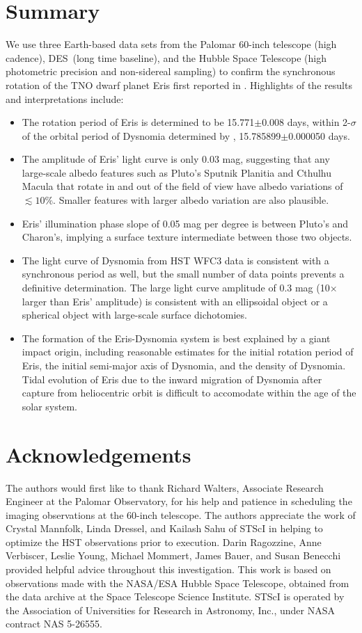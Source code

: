 \documentclass[onecolumn]{aastex631}
\newcommand{\des}{DES}
\begin{document}
\section{Summary}
We use three Earth-based data sets from the Palomar 60-inch telescope (high cadence), \des\ (long time baseline), and the Hubble Space Telescope (high photometric precision and non-sidereal sampling) to confirm the synchronous rotation of the TNO dwarf planet Eris first reported in \citet{szakats}. Highlights of the results and interpretations include:
\begin{itemize}
\item The rotation period of Eris is determined to be 15.771$\pm$0.008 days, within 2-$\sigma$ of the orbital period of Dysnomia determined by \citep{H21}, 15.785899$\pm$0.000050 days.
\item The amplitude of Eris' light curve is only 0.03 mag, suggesting that any large-scale albedo features such as Pluto's Sputnik Planitia and Cthulhu Macula that rotate in and out of the field of view have albedo variations of $\lesssim10\%.$  Smaller features with larger albedo variation are also plausible.
\item Eris' illumination phase slope of 0.05 mag per degree is between Pluto's and Charon's, implying a surface texture intermediate between those two objects.
\item The light curve of Dysnomia from HST WFC3 data is consistent with a synchronous period as well, but the small number of data points prevents a definitive determination. The large light curve amplitude of 0.3 mag (10$\times$ larger than Eris' amplitude) is consistent with an ellipsoidal object or a spherical object with large-scale surface dichotomies.
\item The formation of the Eris-Dysnomia system is best explained by a giant impact origin, including reasonable estimates for the initial rotation period of Eris, the initial semi-major axis of Dysnomia, and the density of Dysnomia. Tidal evolution of Eris due to the inward migration of Dysnomia after capture from heliocentric orbit is difficult to accomodate within the age of the solar system.
\end{itemize}

\section*{Acknowledgements}
The authors would first like to thank Richard Walters, Associate Research Engineer at the Palomar Observatory, for his help and patience in scheduling the imaging observations at the 60-inch telescope. The authors appreciate the work of Crystal Mannfolk, Linda Dressel, and Kailash Sahu of STScI in helping to optimize the HST observations prior to execution. Darin Ragozzine, Anne Verbiscer, Leslie Young, Michael Mommert, James Bauer, and Susan Benecchi provided helpful advice throughout this investigation. This work is based on observations made with the NASA/ESA Hubble Space Telescope, obtained from the data archive at the Space Telescope Science Institute. STScI is operated by the Association of Universities for Research in Astronomy, Inc., under NASA contract NAS 5-26555.
\end{document}
